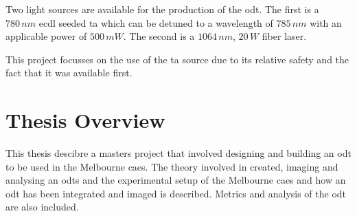 Two light sources are available for the production of the \gls{odt}. The first is a $780\,\unit{nm}$ \gls{ecdl} seeded \gls{ta} which can be detuned to a wavelength of $785\,\unit{nm}$ with an applicable power of $500\,\unit{mW}$. The second is a $1064\,\unit{nm}$, $20\,\unit{W}$ fiber laser.

This project focusses on the use of the \gls{ta} source due to its relative safety and the fact that it was available first.

\section{Thesis Overview}

This thesis descibre a masters project that involved designing and building an \gls{odt} to be used in the Melbourne \gls{caes}. The theory involved in created, imaging and analysing an \glspl{odt} and the experimental setup of the Melbourne \gls{caes} and how an \gls{odt} has been integrated and imaged is described. Metrics and analysis of the \gls{odt} are also included.



